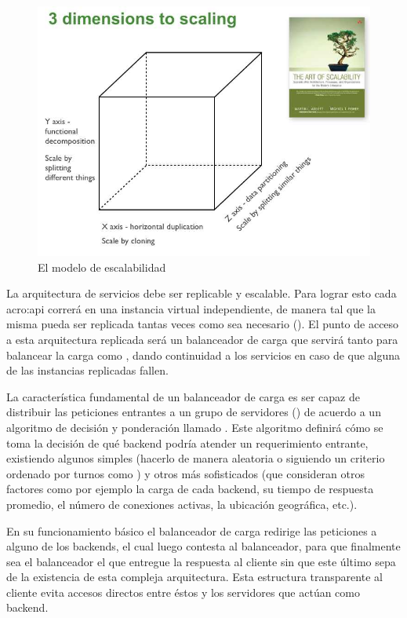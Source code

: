 \begin{figure}[H]
  \includegraphics[width=\linewidth]{src/images/04-capitulo-4/scale_cube.jpg}
  \caption{El modelo de escalabilidad }
  \label{fig:scale-cube}
\end{figure}

La arquitectura de servicios debe ser replicable y escalable. Para lograr esto cada \gls{acro:api} correrá en una instancia virtual independiente, de manera tal que la misma pueda ser replicada tantas veces como sea necesario (). El punto de acceso a esta arquitectura replicada será un balanceador de carga que servirá tanto para balancear la carga como , dando continuidad a los servicios en caso de que alguna de las instancias replicadas fallen.

La característica fundamental de un balanceador de carga es ser capaz de distribuir las peticiones entrantes a un grupo de servidores () de acuerdo a un algoritmo de decisión y ponderación llamado . Este algoritmo definirá cómo se toma la decisión de qué backend podría atender un requerimiento entrante, existiendo algunos simples (hacerlo de manera aleatoria o siguiendo un criterio ordenado por turnos como ) y otros más sofisticados (que consideran otros factores como por ejemplo la carga de cada backend, su tiempo de respuesta promedio, el número de conexiones activas, la ubicación geográfica, etc.).

En su funcionamiento básico el balanceador de carga redirige las peticiones a alguno de los backends, el cual luego contesta al balanceador, para que finalmente sea el balanceador el que entregue la respuesta al cliente sin que este último sepa de la existencia de esta compleja arquitectura. Esta estructura transparente al cliente evita accesos directos entre éstos y los servidores que actúan como backend.

